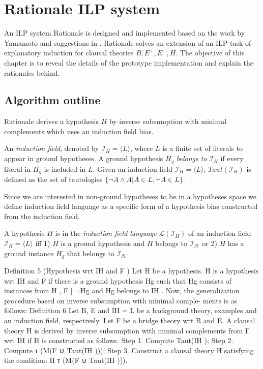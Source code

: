 \chapter{Rationale ILP system}
An ILP system Rationale is designed and implemented based on the work by Yamamoto\cite{yamamoto2012inverse} and suggestions in . Rationale solves an extension of an ILP task of explanatory induction for clausal theories $B, E^+, E^-, H$. The objective of this chapter is to reveal the details of the prototype implementation and explain the rationales behind.

\section{Algorithm outline}
Rationale derives a hypothesis $H$ by inverse subsumption with minimal complements\cite{yamamoto2012inverse} which uses an induction field bias.

\begin{defn}\label{induction_field_definition}\cite{yamamoto2012inverse}
An \emph{induction field}, denoted by $\mathcal{I}_H = \langle L \rangle$,
where $L$ is a finite
set of literals to appear in ground hypotheses.
A ground hypothesis $H_g$ \emph{belongs to} $\mathcal{I}_H$ if
every literal in $H_g$ is included in $L$.
Given an induction field $\mathcal{I}_H = \langle L \rangle$, $Taut(\mathcal{I}_H)$ is defined
as the set of tautologies $\{\neg A \land A | A \in L, \neg A \in L\}$.
\end{defn}



Since we are interested in non-ground hypotheses to be in a hypotheses space we define induction field language as a specific form of a hypothesis bias constructed from the induction field.
\begin{defn}
A hypothesis $H$ is in the \emph{induction field language} $\mathcal{L}(\mathcal{I}_H)$ of an induction field $\mathcal{I}_H=\langle L \rangle$ iff
1) $H$ is a ground hypothesis and $H$ belongs to $\mathcal{I_H}$ or
2) $H$ has a ground instance $H_g$ that belongs to $\mathcal{I_H}$.
\end{defn}

Definition 5 (Hypothesis wrt IH and F ) Let H be a hypothesis. H is a hypothesis wrt
IH and F if there is a ground hypothesis Hg such that Hg consists of instances from H ,
F | ¬Hg and Hg belongs to IH .
Now, the generalization procedure based on inverse subsumption with minimal comple-
ments is as follows:
Definition 6 Let B, E and IH = L be a background theory, examples and an induction
field, respectively. Let F be a bridge theory wrt B and E. A clausal theory H is derived
by inverse subsumption with minimal complements from F wrt IH if H is constructed as
follows.
Step 1. Compute Taut(IH );
Step 2. Compute τ (M(F ∪ Taut(IH )));
Step 3. Construct a clausal theory H satisfying the condition:
H
τ (M(F ∪ Taut(IH ))).


